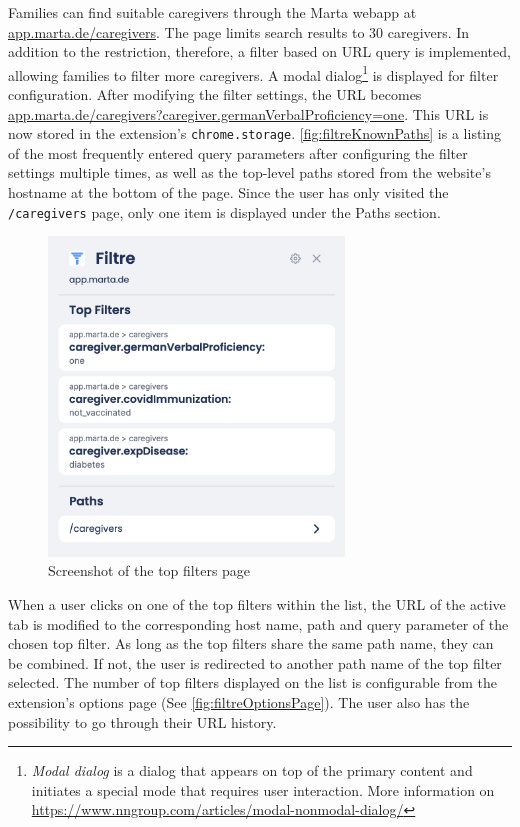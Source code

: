 Families can find suitable caregivers through the Marta webapp at \url{app.marta.de/caregivers}. The page limits search results to 30 caregivers. In addition to the restriction, therefore, a filter based on URL query is implemented, allowing families to filter more caregivers. A modal dialog\footnote{\emph{Modal dialog} is a dialog that appears on top of the primary content and initiates a special mode that requires user interaction. More information on \url{https://www.nngroup.com/articles/modal-nonmodal-dialog/}} is displayed for filter configuration. After modifying the filter settings, the URL becomes \url{app.marta.de/caregivers?caregiver.germanVerbalProficiency=one}. This URL is now stored in the extension's \texttt{chrome.storage}. \autoref{fig:filtreKnownPaths} is a listing of the most frequently entered query parameters after configuring the filter settings multiple times, as well as the top-level paths stored from the website's hostname at the bottom of the page. Since the user has only visited the \texttt{/caregivers} page, only one item is displayed under the Paths section.

\begin{figure}[H]
  \centering
  \includegraphics[width=0.7\textwidth]{assets/screenshot_filtre_top_filters.png}
  \caption{Screenshot of the top filters page}
  \label{fig:filtreKnownPaths}
\end{figure}

When a user clicks on one of the top filters within the list, the URL of the active tab is modified to the corresponding host name, path and query parameter of the chosen top filter. As long as the top filters share the same path name, they can be combined. If not, the user is redirected to another path name of the top filter selected. The number of top filters displayed on the list is configurable from the extension's options page (See \autoref{fig:filtreOptionsPage}). The user also has the possibility to go through their URL history.

